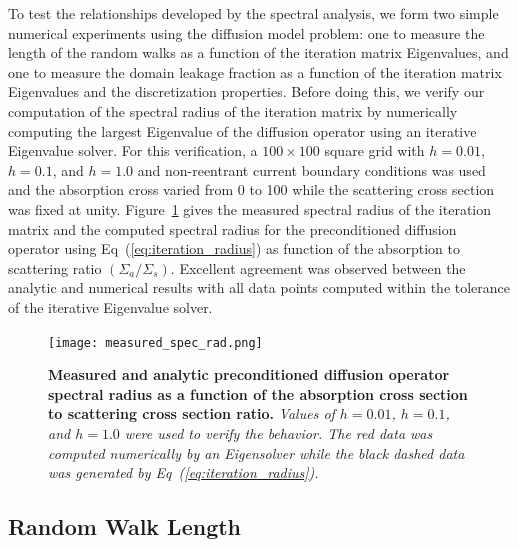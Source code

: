 \documentclass{mc2013}
\begin{document}
To test the relationships developed by the spectral analysis, we form
two simple numerical experiments using the diffusion model problem:
one to measure the length of the random walks as a function of the
iteration matrix Eigenvalues, and one to measure the domain leakage
fraction as a function of the iteration matrix Eigenvalues and the
discretization properties. Before doing this, we verify our
computation of the spectral radius of the iteration matrix by
numerically computing the largest Eigenvalue of the diffusion operator
using an iterative Eigenvalue solver. For this verification, a $100
\times 100$ square grid with $h=0.01$, $h=0.1$, and $h=1.0$ and
non-reentrant current boundary conditions was used and the absorption
cross varied from 0 to 100 while the scattering cross section was
fixed at unity. Figure~\ref{fig:measured_spec_rad} gives the measured
spectral radius of the iteration matrix and the computed spectral
radius for the preconditioned diffusion operator using
Eq~(\ref{eq:iteration_radius}) as function of the absorption to
scattering ratio $(\Sigma_a / \Sigma_s)$. Excellent agreement was
observed between the analytic and numerical results with all data
points computed within the tolerance of the iterative Eigenvalue
solver.
\begin{figure}[ht!]
  \begin{spacing}{1.0}
    \begin{center}
      \texttt{[image: measured\_spec\_rad.png]}
    \end{center}
    \caption{\textbf{Measured and analytic preconditioned diffusion
        operator spectral radius as a function of the absorption cross
        section to scattering cross section ratio.} \textit{Values of
        $h=0.01$, $h=0.1$, and $h=1.0$ were used to verify the
        behavior. The red data was computed numerically by an
        Eigensolver while the black dashed data was generated by
        Eq~(\ref{eq:iteration_radius}).}}
    \label{fig:measured_spec_rad}
  \end{spacing}
\end{figure}

\subsection{Random Walk Length}
\label{subsec:walk_length}
\end{document}
